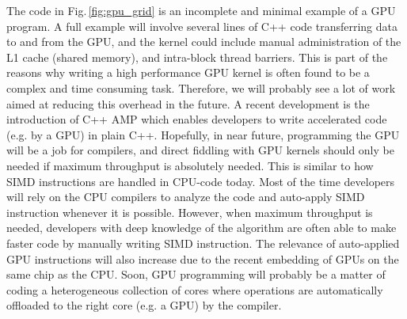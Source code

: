 The code in Fig.\,\ref{fig:gpu_grid} is an incomplete and minimal example of a GPU program. A full example will involve several lines of C++ code transferring data to and from the GPU, and the kernel could include manual administration of the L1 cache (shared memory), and intra-block thread barriers. This is part of the reasons why writing a high performance GPU kernel is often found to be a complex and time consuming task. Therefore, we will probably see a lot of work aimed at reducing this overhead in the future.  A recent development is the introduction of C++ AMP which enables developers to write accelerated code (e.g. by a GPU) in plain C++. Hopefully, in near future, programming the GPU will be a job for compilers, and direct fiddling with GPU kernels should only be needed if maximum throughput is absolutely needed. This is similar to how SIMD instructions are handled in CPU-code today. Most of the time developers will rely on the CPU compilers to analyze the code and auto-apply SIMD instruction whenever it is possible. However, when maximum throughput is needed, developers with deep knowledge of the algorithm are often able to make faster code by manually writing SIMD instruction. The relevance of auto-applied GPU instructions will also increase due to the recent embedding of GPUs on the same chip as the CPU. Soon, GPU programming will probably be a matter of coding a heterogeneous collection of cores where operations are automatically offloaded to the right core (e.g. a GPU) by the compiler.

